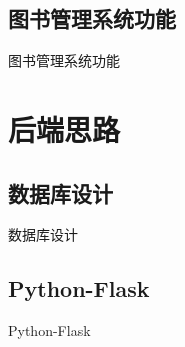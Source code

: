 \documentclass{ctexbeamer}
\begin{document}
\subsection{图书管理系统功能}
\begin{frame}{图书管理系统功能}
  
\end{frame}

\section{后端思路}

\subsection{数据库设计}
\begin{frame}{数据库设计}
  
\end{frame}

\subsection{Python-Flask}
\begin{frame}{Python-Flask}
  
\end{frame}
\end{document}

